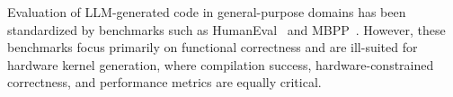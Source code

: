 Evaluation of LLM-generated code in general-purpose domains has been standardized by benchmarks such as HumanEval~\cite{chen2021evaluating} and MBPP~\cite{austin2021program}. However, these benchmarks focus primarily on functional correctness and are ill-suited for hardware kernel generation, where compilation success, hardware-constrained correctness, and performance metrics are equally critical.

